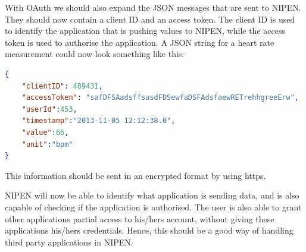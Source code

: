 With OAuth we should also expand the JSON messages that are sent to NIPEN.
They should now contain a client ID and an access token.
The client ID is used to identify the application that is pushing values to NIPEN, while the access token is used to authorise the application.
A JSON string for a heart rate measurement could now look something like this:

\begin{lstlisting}[language=json]
{
	"clientID": 489431,
	"accessToken": "safDFSAadsffsasdFDSewfaDSFAdsfaewRETrehhgreeErw",
	"userId":453,
	"timestamp":"2013-11-05 12:12:38.0",
	"value":66,
	"unit":"bpm"
}
\end{lstlisting}

This information should be sent in an encrypted format by using https.

NIPEN will now be able to identify what application is sending data, and is also capable of checking if the application is authorised.
The user is also able to grant other applications partial access to his/hers account, without giving these applications his/hers credentials.
Hence, this should be a good way of handling third party applications in NIPEN.

